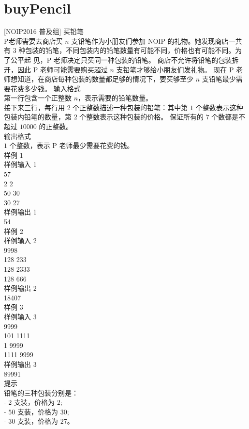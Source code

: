 \documentclass[12pt,twiside,a4paper]{ctexbook}
\numberwithin{chapter}{part}
\begin{document}
\section{buyPencil}
[NOIP2016 普及组] 买铅笔\\
P老师需要去商店买 $n$ 支铅笔作为小朋友们参加 NOIP 的礼物。她发现商店一共有 $3$ 种包装的铅笔，不同包装内的铅笔数量有可能不同，价格也有可能不同。为了公平起 见，P 老师决定只买同一种包装的铅笔。
商店不允许将铅笔的包装拆开，因此 P 老师可能需要购买超过 $n$ 支铅笔才够给小朋友们发礼物。
现在 P 老师想知道，在商店每种包装的数量都足够的情况下，要买够至少 $n$ 支铅笔最少需要花费多少钱。
 输入格式\\
第一行包含一个正整数 $n$，表示需要的铅笔数量。\\
接下来三行，每行用 $2$ 个正整数描述一种包装的铅笔：其中第 $1$ 个整数表示这种包装内铅笔的数量，第 $2$ 个整数表示这种包装的价格。
保证所有的 $7$ 个数都是不超过 $10000$ 的正整数。\\
 输出格式\\
$1$ 个整数，表示 P 老师最少需要花费的钱。\\
 样例 1\\
 样例输入 1\\
57\\
2 2\\
50 30\\
30 27\\
 样例输出 1\\
54\\
 样例 2\\
 样例输入 2\\
9998\\
128 233\\
128 2333\\
128 666\\
 样例输出 2\\
18407\\
 样例 3\\
 样例输入 3\\
9999\\
101 1111\\
1 9999\\
1111 9999\\
 样例输出 3\\
89991\\
 提示\\
铅笔的三种包装分别是：\\
- $2$ 支装，价格为 $2$;\\
- $50$ 支装，价格为 $30$;\\
- $30$ 支装，价格为 $27$。\\
\end{document}
